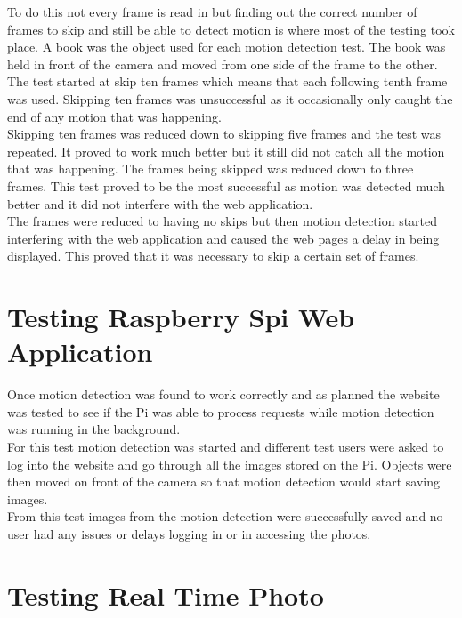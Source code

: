 \documentclass[12pt]{report}
\begin{document}
To do this not every frame is read in but finding out the correct number of frames to skip and still be able to detect motion is where most of the testing took place. A book was the object used for each motion detection test. The book was held in front of the camera and moved from one side of the frame to the other. The test started at skip ten frames which means that each following tenth frame was used. Skipping ten frames was unsuccessful as it occasionally only caught the end of any motion that was happening.\\

Skipping ten frames was reduced down to skipping five frames and the test was repeated. It proved to work much better but it still did not catch all the motion that was happening. The frames being skipped was reduced down to three frames. This test proved to be the most successful as motion was detected much better and it did not interfere with the web application.\\

The frames were reduced to having no skips but then motion detection started interfering with the web application and caused the web pages a delay in being displayed. This proved that it was necessary to skip a certain set of frames.\\

\section{Testing Raspberry Spi Web Application}
\label{sec:websiteTest}
%
Once motion detection was found to work correctly and as planned the website was tested to see if the Pi was able to process requests while motion detection was running in the background.\\

For this test motion detection was started and different test users were asked to log into the website and go through all the images stored on the Pi. Objects were then moved on front of the camera so that motion detection would start saving images.\\ 

From this test images from the motion detection were successfully saved and no user had any issues or delays logging in or in accessing the photos.\\

\section{Testing Real Time Photo}
\label{sec:realPhotoTest}
%
\end{document}
